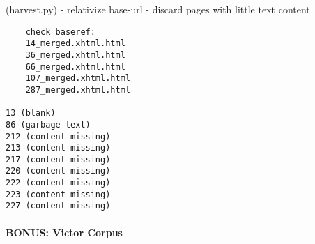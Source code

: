\begin{longversion}
\begin{verbatim}
    \end{verbatim}
    (harvest.py)
    - relativize base-url
    - discard pages with little text content


    \begin{verbatim}
    check baseref:
    14_merged.xhtml.html
    36_merged.xhtml.html
    66_merged.xhtml.html
    107_merged.xhtml.html
    287_merged.xhtml.html

13 (blank)
86 (garbage text)
212 (content missing)
213 (content missing)
217 (content missing)
220 (content missing)
222 (content missing)
223 (content missing)
227 (content missing)

    \end{verbatim}


\paragraph{BONUS: Victor Corpus}

%




%
%
\end{longversion}

